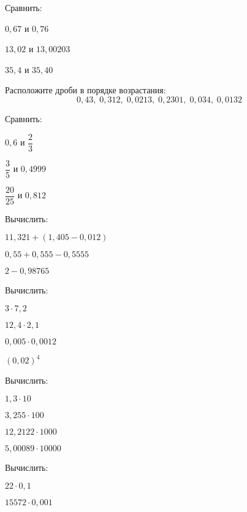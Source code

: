 \begin{listofex}
	\item Сравнить:
	\begin{enumcols}[itemcolumns=3]
		\item \( 0,67 \) и \( 0,76 \)
		\item \( 13,02 \) и \( 13,00203 \)
		\item \( 35,4 \) и \( 35,40 \)
	\end{enumcols}
	\item Расположите дроби в порядке возрастания:
	\[ 0,43,\;0,312,\;0,0213,\;0,2301,\;0,034,\;0,0132 \]
	\item Сравнить:
	\begin{enumcols}[itemcolumns=3]
		\item \( 0,6 \) и \( \dfrac{2}{3} \)
		\item \( \dfrac{3}{5} \) и \( 0,4999 \)
		\item \( \dfrac{20}{25} \) и \( 0,812 \)
	\end{enumcols}
	\item Вычислить:
	\begin{enumcols}[itemcolumns=3]
		\item \( 11,321+(1,405-0,012) \)
		\item \( 0,55+0,555-0,5555 \)
		\item \( 2-0,98765 \)
	\end{enumcols}
	\item Вычислить:
	\begin{enumcols}[itemcolumns=4]
		\item \( 3\cdot7,2 \)
		\item \( 12,4\cdot2,1 \)
		\item \( 0,005\cdot0,0012 \)
		\item \( (0,02)^4 \)
	\end{enumcols}
	\item Вычислить:
	\begin{enumcols}[itemcolumns=4]
		\item \( 1,3\cdot10 \)
		\item \( 3,255\cdot100 \)
		\item \( 12,2122\cdot1000 \)
		\item \( 5,00089\cdot10000 \)
	\end{enumcols}
	\item Вычислить:
	\begin{enumcols}[itemcolumns=4]
		\item \( 22\cdot0,1 \)
		\item \( 15572\cdot0,001 \)

\end{enumcols}
\end{listofex}
